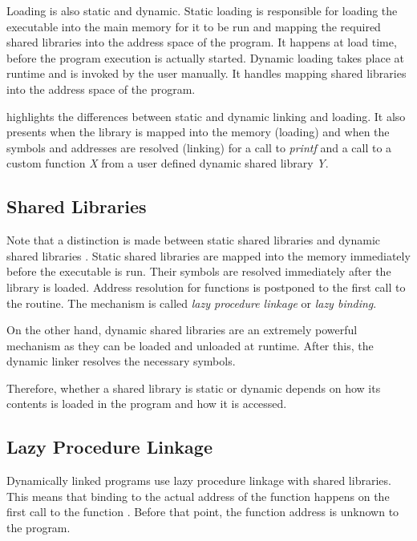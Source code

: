 Loading is also static and dynamic. Static loading is responsible for loading the executable into the main memory for it to be run and mapping the required shared libraries into the address space of the program. It happens at load time, before the program execution is actually started. Dynamic loading takes place at runtime and is invoked by the user manually. It handles mapping shared libraries into the address space of the program.

 highlights the differences between static and dynamic linking and loading. It also presents when the library is mapped into the memory (loading) and when the symbols and addresses are resolved (linking) for a call to \textit{printf} and a call to a custom function \textit{X} from a user defined dynamic shared library \textit{Y}.

\subsection{Shared Libraries}
\label{sub-sec:shared-libraries}

Note that a distinction is made between static shared libraries and dynamic shared libraries \cite{linkers-and-loaders}. Static shared libraries are mapped into the memory immediately before the executable is run. Their symbols are resolved immediately after the library is loaded. Address resolution for functions is postponed to the first call to the routine. The mechanism is called \textit{lazy procedure linkage} or \textit{lazy binding}.

On the other hand, dynamic shared libraries are an extremely powerful mechanism as they can be loaded and unloaded at runtime. After this, the dynamic linker resolves the necessary symbols.

Therefore, whether a shared library is static or dynamic depends on how its contents is loaded in the program and how it is accessed.

\subsection{Lazy Procedure Linkage}
\label{sub-sec:lazy-proc-link}

Dynamically linked programs use lazy procedure linkage with shared libraries. This means that binding to the actual address of the function happens on the first call to the function \cite{linkers-and-loaders}. Before that point, the function address is unknown to the program.

